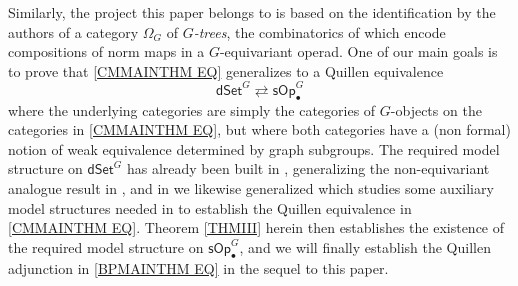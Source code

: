\documentclass[a4paper,10pt
,draft
]{article}%
\numberwithin{equation}{section}
\numberwithin{figure}{section}
\theoremstyle{definition} %
\newcommand{\1}{\ensuremath{\mathbbm 1}}%
\begin{document}
Similarly, the project this paper belongs to is based on the identification by the authors of a category
$\Omega_G$ of \emph{$G$-trees},
the combinatorics of which encode compositions of norm maps in a $G$-equivariant operad.
One of our main goals is to prove that 
\eqref{CMMAINTHM EQ}
generalizes to a Quillen equivalence 
\begin{equation}\label{BPMAINTHM EQ}
\mathsf{dSet}^G \rightleftarrows \mathsf{sOp}_{\bullet}^G
\end{equation}
where the underlying categories are simply the categories 
of $G$-objects on the categories in 
\eqref{CMMAINTHM EQ},
but where both categories have a (non formal) notion of weak equivalence determined by graph subgroups.
The required model structure on $\mathsf{dSet}^G$
has already been built in \cite{Per18},
generalizing the non-equivariant analogue result in \cite{BM11},
and in \cite{BP_edss} we likewise generalized \cite{CM13a}
which studies some auxiliary model structures 
needed in \cite{CM13b} to establish the Quillen equivalence in 
\eqref{CMMAINTHM EQ}.
Theorem \ref{THMIII} herein then establishes the existence of the required model structure on 
$\mathsf{sOp}_{\bullet}^G$,
and we will finally establish the Quillen adjunction in
\eqref{BPMAINTHM EQ}
in the sequel to this paper.
\end{document}
